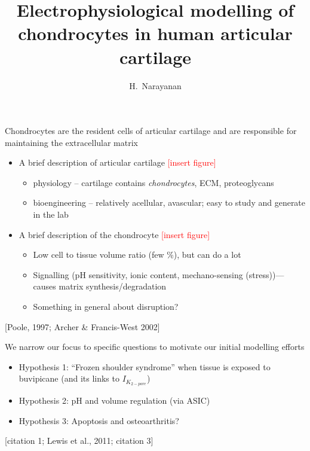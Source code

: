 \documentclass[ignorenonframetext]{beamer}
\title{Electrophysiological modelling of chondrocytes in human
  articular cartilage}
\author{H.~Narayanan}
\institute[]{}
\date[]{}
\newcommand{\references}[1] {
  \begin{flushright}
    \scriptsize [#1] \normalsize
  \end{flushright}
}
\newcommand{\addfigure} {
  \scriptsize
  \textcolor{red}{[insert figure]}
  \normalsize
}
\begin{document}
%
%
%

\frame{\titlepage}


\begin{frame}{Chondrocytes are the resident cells of articular
    cartilage and are responsible for maintaining the extracellular
    matrix}

  \begin{itemize}
  \item A brief description of articular cartilage \addfigure
    \begin{itemize}
    \item physiology --  cartilage contains {\em chondrocytes}, ECM,
      proteoglycans
    \item bioengineering -- relatively acellular, avascular; easy to
      study and generate in the lab
    \end{itemize}
  \item A brief description of the chondrocyte \addfigure
    \begin{itemize}
    \item Low cell to tissue volume ratio (few \%), but can do a lot
    \item Signalling (pH sensitivity, ionic content, mechano-sensing
      (stress))---causes matrix synthesis/degradation
    \item Something in general about disruption?
    \end{itemize}
  \end{itemize}

\references{Poole, 1997; Archer \& Francis-West 2002}

\end{frame}

%

\begin{frame}{We narrow our focus to specific questions to motivate
    our initial modelling efforts}

  \begin{itemize}
  \item Hypothesis 1: ``Frozen shoulder syndrome'' when tissue is
    exposed to buvipicane (and its links to $I_{K_{2-pore}}$)
  \item Hypothesis 2: pH and volume regulation (via ASIC)
  \item Hypothesis 3: Apoptosis and osteoarthritis?
  \end{itemize}

\references{citation 1; Lewis et al., 2011; citation 3}

\end{frame}
\end{document}
